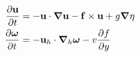 \begin{subequations}
	\label{eq:theory6}
\begin{align}
\dpr{\vec{u}}{t}
	&=
-
\vec{u} \cdot \grad \vec{u}
	-
		\vec{f} \times \vec{u}
	+
	g \vec{\nabla} \eta
	\label{eq:NS6} \\
	 \addtocounter{equation}{+1}
\dpr{\vec{\omega}}{t}
	&=
	-\vec{u}_{h} \cdot \grad_{h} \vec{\omega}
	-v \dpr{f}{y}
	\label{eq:vort6}
\end{align}
\end{subequations}

